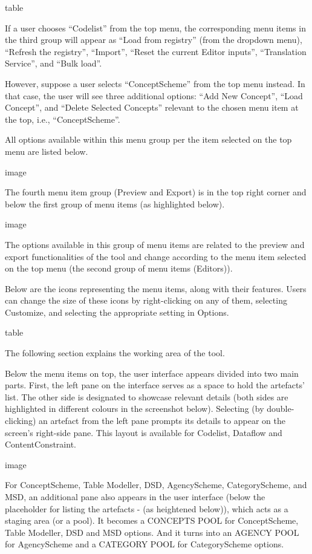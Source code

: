 \documentclass[
]{book}
\theoremstyle{definition}
\theoremstyle{definition}
\theoremstyle{definition}
\theoremstyle{definition}
\theoremstyle{remark}
\begin{document}
table

If a user chooses ``Codelist'' from the top menu, the corresponding menu items in the third group will appear as ``Load from registry'' (from the dropdown menu), ``Refresh the registry'', ``Import'', ``Reset the current Editor inputs'', ``Translation Service'', and ``Bulk load''.

However, suppose a user selects ``ConceptScheme'' from the top menu instead. In that case, the user will see three additional options: ``Add New Concept'', ``Load Concept'', and ``Delete Selected Concepts'' relevant to the chosen menu item at the top, i.e., ``ConceptScheme''.

All options available within this menu group per the item selected on the top menu are listed below.

image

The fourth menu item group (Preview and Export) is in the top right corner and below the first group of menu items (as highlighted below).

image

The options available in this group of menu items are related to the preview and export functionalities of the tool and change according to the menu item selected on the top menu (the second group of menu items (Editors)).

Below are the icons representing the menu items, along with their features. Users can change the size of these icons by right-clicking on any of them, selecting Customize, and selecting the appropriate setting in Options.

table

The following section explains the working area of the tool.

Below the menu items on top, the user interface appears divided into two main parts. First, the left pane on the interface serves as a space to hold the artefacts' list. The other side is designated to showcase relevant details (both sides are highlighted in different colours in the screenshot below). Selecting (by double-clicking) an artefact from the left pane prompts its details to appear on the screen's right-side pane. This layout is available for Codelist, Dataflow and ContentConstraint.

image

For ConceptScheme, Table Modeller, DSD, AgencyScheme, CategoryScheme, and MSD, an additional pane also appears in the user interface (below the placeholder for listing the artefacts - (as heightened below)), which acts as a staging area (or a pool). It becomes a CONCEPTS POOL for ConceptScheme, Table Modeller, DSD and MSD options. And it turns into an AGENCY POOL for AgencyScheme and a CATEGORY POOL for CategoryScheme options.
\end{document}
